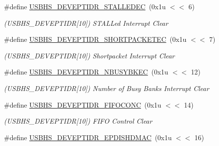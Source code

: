 \begin{DoxyCompactItemize}
\#define \mbox{\hyperlink{group__SAMS70__USBHS_ga5cea648181f2c3156e6032c654e37c3f}{U\+S\+B\+H\+S\+\_\+\+D\+E\+V\+E\+P\+T\+I\+D\+R\+\_\+\+S\+T\+A\+L\+L\+E\+D\+EC}}~(0x1u $<$$<$ 6)
\begin{DoxyCompactList}\small\item\em (U\+S\+B\+H\+S\+\_\+\+D\+E\+V\+E\+P\+T\+I\+DR\mbox{[}10\mbox{]}) S\+T\+A\+L\+Led Interrupt Clear \end{DoxyCompactList}\item 
\mbox{\label{group__SAMS70__USBHS_ga96d9c09a63e83aaddcd44de4b3bf5850}} 
\#define \mbox{\hyperlink{group__SAMS70__USBHS_ga96d9c09a63e83aaddcd44de4b3bf5850}{U\+S\+B\+H\+S\+\_\+\+D\+E\+V\+E\+P\+T\+I\+D\+R\+\_\+\+S\+H\+O\+R\+T\+P\+A\+C\+K\+E\+T\+EC}}~(0x1u $<$$<$ 7)
\begin{DoxyCompactList}\small\item\em (U\+S\+B\+H\+S\+\_\+\+D\+E\+V\+E\+P\+T\+I\+DR\mbox{[}10\mbox{]}) Shortpacket Interrupt Clear \end{DoxyCompactList}\item 
\mbox{\label{group__SAMS70__USBHS_ga4e2f76ccd5459ef8b5cfb351aced0739}} 
\#define \mbox{\hyperlink{group__SAMS70__USBHS_ga4e2f76ccd5459ef8b5cfb351aced0739}{U\+S\+B\+H\+S\+\_\+\+D\+E\+V\+E\+P\+T\+I\+D\+R\+\_\+\+N\+B\+U\+S\+Y\+B\+K\+EC}}~(0x1u $<$$<$ 12)
\begin{DoxyCompactList}\small\item\em (U\+S\+B\+H\+S\+\_\+\+D\+E\+V\+E\+P\+T\+I\+DR\mbox{[}10\mbox{]}) Number of Busy Banks Interrupt Clear \end{DoxyCompactList}\item 
\mbox{\label{group__SAMS70__USBHS_gac5e288e661689315f4117ff53ee0d480}} 
\#define \mbox{\hyperlink{group__SAMS70__USBHS_gac5e288e661689315f4117ff53ee0d480}{U\+S\+B\+H\+S\+\_\+\+D\+E\+V\+E\+P\+T\+I\+D\+R\+\_\+\+F\+I\+F\+O\+C\+O\+NC}}~(0x1u $<$$<$ 14)
\begin{DoxyCompactList}\small\item\em (U\+S\+B\+H\+S\+\_\+\+D\+E\+V\+E\+P\+T\+I\+DR\mbox{[}10\mbox{]}) F\+I\+FO Control Clear \end{DoxyCompactList}\item 
\mbox{\label{group__SAMS70__USBHS_ga7e9c8bb6c459044f908e16ad2aef1126}} 
\#define \mbox{\hyperlink{group__SAMS70__USBHS_ga7e9c8bb6c459044f908e16ad2aef1126}{U\+S\+B\+H\+S\+\_\+\+D\+E\+V\+E\+P\+T\+I\+D\+R\+\_\+\+E\+P\+D\+I\+S\+H\+D\+M\+AC}}~(0x1u $<$$<$ 16)
$$
\end{DoxyCompactItemize}

